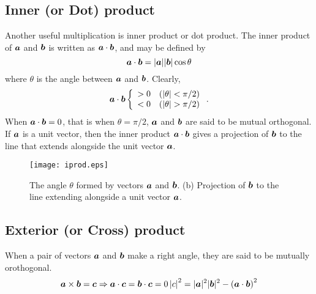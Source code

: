 \documentclass[10pt,a4j]{article}
\begin{document}
\subsection{Inner (or Dot) product} 
Another useful multiplication is inner product or dot product.
The inner product of $\mbox{\boldmath $a$}$ and $\mbox{\boldmath $b$}$ is written as $\mbox{\boldmath $a$}\cdot\mbox{\boldmath $b$}$, and 
 may be defined by 
\begin{equation}
	\mbox{\boldmath $a$}\cdot\mbox{\boldmath $b$}=|\mbox{\boldmath $a$}||\mbox{\boldmath $b$}|\cos\theta
\end{equation}
where $\theta$ is the angle between $\mbox{\boldmath $a$}$ and $\mbox{\boldmath $b$}$. 
Clearly, 
\begin{equation}
	\mbox{\boldmath $a$}\cdot\mbox{\boldmath $b$}
	\left\{
	\begin{array}{cc}
		>0 & ( |\theta|< \pi/2) \\
		<0 & ( |\theta| > \pi/2)
	\end{array}
	\right.
	.
	\label{eqn:}
\end{equation}
When $\mbox{\boldmath $a$}\cdot\mbox{\boldmath $b$}=0$, that is when $\theta=\pi/2$, $\mbox{\boldmath $a$}$ and $\mbox{\boldmath $b$}$ 
are said to be mutual orthogonal.
If $\mbox{\boldmath $a$}$ is a unit vector, then the inner product $\mbox{\boldmath $a$}\cdot\mbox{\boldmath $b$}$ gives 
a projection of $\mbox{\boldmath $b$}$ to the line that extends alongside the unit vector $\mbox{\boldmath $a$}$. 
\begin{figure}[h]
	\begin{center}
	\texttt{[image: iprod.eps]} 
	\end{center}
	\caption{The angle $\theta$ formed by vectors $\mbox{\boldmath $a$}$ and $\mbox{\boldmath $b$}$. 
	(b) Projection of $\mbox{\boldmath $b$}$ to the line extending alongside a unit vector $\mbox{\boldmath $a$}$.} 
	\label{fig:fig1_5}
\end{figure}
\subsection{Exterior (or Cross) product} 
When a pair of vectors $\mbox{\boldmath $a$}$ and $\mbox{\boldmath $b$}$ make a right 
angle, they are said to be mutually orothogonal.  
\[
	\mbox{\boldmath $a$}\times \mbox{\boldmath $b$}= \mbox{\boldmath $c$}
	\Rightarrow
	\mbox{\boldmath $a$}\cdot\mbox{\boldmath $c$}=\mbox{\boldmath $b$}\cdot\mbox{\boldmath $c$}=0
	\left|c\right|^2=|\mbox{\boldmath $a$}|^2|\mbox{\boldmath $b$}|^2-\left(\mbox{\boldmath $a$}\cdot\mbox{\boldmath $b$}\right)^2
\]
\end{document}
